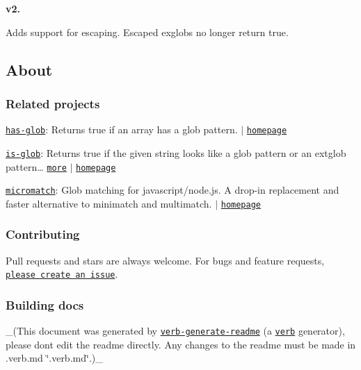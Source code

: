 {\bfseries v2.}

Adds support for escaping. Escaped exglobs no longer return true.

\subsection*{About}

\subsubsection*{Related projects}


\begin{DoxyItemize}
\item \href{https://www.npmjs.com/package/has-glob}{\tt has-\/glob}\+: Returns {\ttfamily true} if an array has a glob pattern. $\vert$ \href{https://github.com/jonschlinkert/has-glob}{\tt homepage}
\item \href{https://www.npmjs.com/package/is-glob}{\tt is-\/glob}\+: Returns {\ttfamily true} if the given string looks like a glob pattern or an extglob pattern… \href{https://github.com/jonschlinkert/is-glob}{\tt more} $\vert$ \href{https://github.com/jonschlinkert/is-glob}{\tt homepage}
\item \href{https://www.npmjs.com/package/micromatch}{\tt micromatch}\+: Glob matching for javascript/node.\+js. A drop-\/in replacement and faster alternative to minimatch and multimatch. $\vert$ \href{https://github.com/jonschlinkert/micromatch}{\tt homepage}
\end{DoxyItemize}

\subsubsection*{Contributing}

Pull requests and stars are always welcome. For bugs and feature requests, \href{../../issues/new}{\tt please create an issue}.

\subsubsection*{Building docs}

\+\_\+(This document was generated by \href{https://github.com/verbose/verb-generate-readme}{\tt verb-\/generate-\/readme} (a \href{https://github.com/verbose/verb}{\tt verb} generator), please don\textquotesingle{}t edit the readme directly. Any changes to the readme must be made in .verb.\+md \char`\"{}.\+verb.\+md\char`\"{}.)\+\_\+

